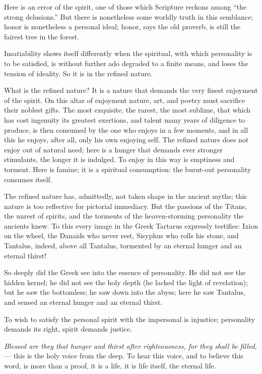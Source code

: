 \documentclass[12pt,a4paper]{book}
\begin{document}
Here is an error of the spirit, one of those which Scripture reckons among ``the strong delusions.'' But there is nonetheless some worldly truth in this semblance; honor is nonetheless a personal ideal; honor, says the old proverb, is still the fairest tree in the forest.

Insatiability shows itself differently when the spiritual, with which personality is to be satisfied, is without further ado degraded to a finite means, and loses the tension of ideality. So it is in the refined nature.

What is the refined nature? It is a nature that demands the very finest enjoyment of the spirit. On this altar of enjoyment
nature, art, and poetry must sacrifice their noblest gifts. The most exquisite, the rarest, the most sublime, that which has cost ingenuity its greatest exertions, and talent many years of diligence to produce, is then consumed by the one who enjoys in a few moments, and in all this he enjoys, after all, only his own enjoying self. The refined nature does not enjoy out of natural need; here is a hunger that demands ever stronger stimulants, the longer it is indulged. To enjoy in this way is emptiness and torment. Here is famine; it is a spiritual consumption: the burnt-out personality consumes itself.

The refined nature has, admittedly, not taken shape in the ancient myths; this nature is too reflective for pictorial immediacy. But the passions of the Titans, the unrest of spirits, and the torments of the heaven-storming personality the ancients knew. To this every image in the Greek Tartarus expressly testifies: Ixion on the wheel, the Danaids who never rest, Sisyphus who rolls his stone, and Tantalus, indeed, above all Tantalus, tormented by an eternal hunger and an eternal thirst!

So deeply did the Greek see into the essence of personality. He did not see the hidden kernel; he did not see the holy depth (he lacked the light of revelation); but he saw the bottomless; he saw down into the abyss; here he saw Tantalus, and sensed an eternal hunger and an eternal thirst.

To wish to satisfy the personal spirit with the impersonal is injustice; personality demands its right, spirit demands justice.

\emph{Blessed are they that hunger and thirst after righteousness, for they shall be filled,} --- this is the holy voice from the deep. To hear this voice, and to believe this word, is more than a proof, it is a life, it is life itself, the eternal life.
\end{document}
